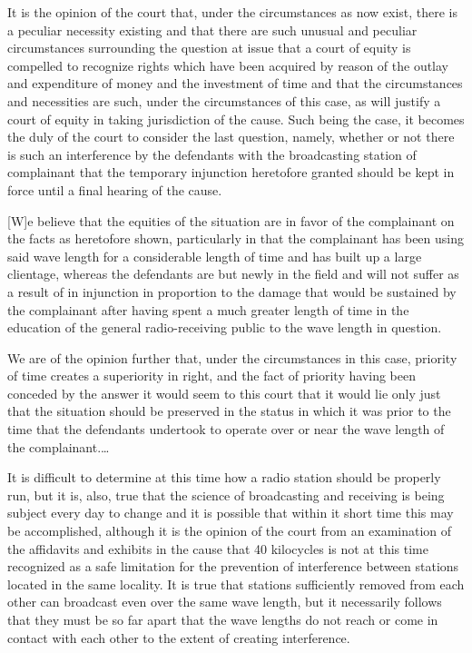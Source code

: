 It is the opinion of the court that, under the circumstances as now exist, there
is a peculiar necessity existing and that there are such unusual and peculiar
circumstances surrounding the question at issue that a court of equity is
compelled to recognize rights which have been acquired by reason of the outlay
and expenditure of money and the investment of time and that the
circumstances and necessities are such, under the circumstances of this case,
as will justify a court of equity in taking jurisdiction of the cause. Such
being the case, it becomes the duly of the court to consider the last question,
namely, whether or not there is such an interference by the defendants with the
broadcasting station of complainant that the temporary injunction
heretofore granted should be kept in force until a final hearing of the
cause.

[W]e believe that the equities of the situation are in favor of the complainant
on the facts as heretofore shown, particularly in that the complainant has been
using said wave length for a considerable length of time and has built up a
large clientage, whereas the defendants are but newly in the field and will not
suffer as a result of in injunction in proportion to the damage that would be
sustained by the complainant after having spent a much greater length of time
in the education of the general radio-receiving public to the wave length in
question.

We are of the opinion further that, under the circumstances in this case,
priority of time creates a superiority in right, and the fact of priority
having been conceded by the answer it would seem to this court that it would
lie only just that the situation should be preserved in the status in which it
was prior to the time that the defendants undertook to operate over or near the
wave length of the complainant.\ldots

It is difficult to determine at this time how a radio station should be properly
run, but it is, also, true that the science of broadcasting and receiving is
being subject every day to change and it is possible that within it short time
this may be accomplished, although it is the opinion of the court from an
examination of the affidavits and exhibits in the cause that 40 kilocycles is
not at this time recognized as a safe limitation for the prevention of
interference between stations located in the same locality. It is true that
stations sufficiently removed from each other can broadcast even over the
same wave length, but it necessarily follows that they must be so far apart
that the wave lengths do not reach or come in contact with each other to the
extent of creating interference.

